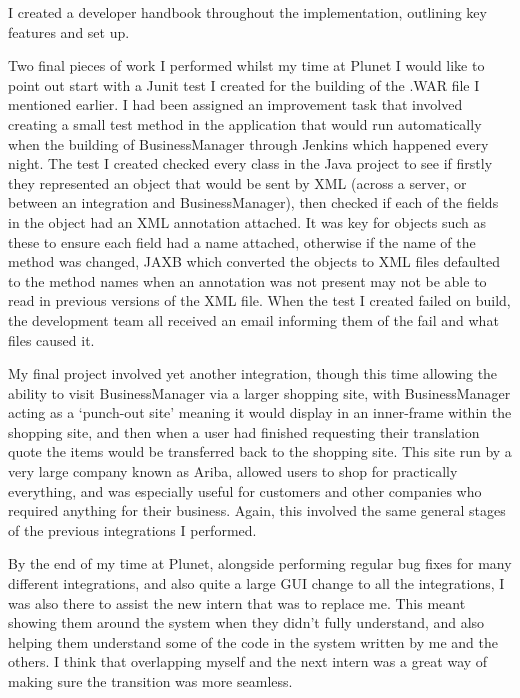 \documentclass[12pt]{article}
\begin{document}
I created a developer handbook throughout the implementation, outlining key features and set up.\\ \par \noindent
Two final pieces of work I performed whilst my time at Plunet I would like to point out start with a Junit test I
created for the building of the .WAR file I mentioned earlier. I had been assigned an improvement task that involved
creating a small test method in the application that would run automatically when the building of BusinessManager
through Jenkins which happened every night. The test I created checked every class in the Java project to see if firstly
they represented an object that would be sent by XML (across a server, or between an integration and BusinessManager),
then checked if each of the fields in the object had an XML annotation attached. It was key for objects such as these to
ensure each field had a name attached, otherwise if the name of the method was changed, JAXB which converted the objects
to XML files defaulted to the method names when an annotation was not present may not be able to read in previous
versions of the XML file. When the test I created failed on build, the development team all received an email informing
them of the fail and what files caused it.\\ \par \noindent
My final project involved yet another integration, though this time allowing the ability to visit BusinessManager via a
larger shopping site, with BusinessManager acting as a ‘punch-out site’ meaning it would display in an inner-frame
within the shopping site, and then when a user had finished requesting their translation quote the items would be
transferred back to the shopping site. This site run by a very large company known as Ariba, allowed users to shop for
practically everything, and was especially useful for customers and other companies who required anything for their
business. Again, this involved the same general stages of the previous integrations I performed.\\ \par \noindent
By the end of my time at Plunet, alongside performing regular bug fixes for many different integrations, and also quite
a large GUI change to all the integrations, I was also there to assist the new intern that was to replace me. This meant
showing them around the system when they didn’t fully understand, and also helping them understand some of the code in
the system written by me and the others. I think that overlapping myself and the next intern was a great way of making
sure the transition was more seamless.
\end{document}
